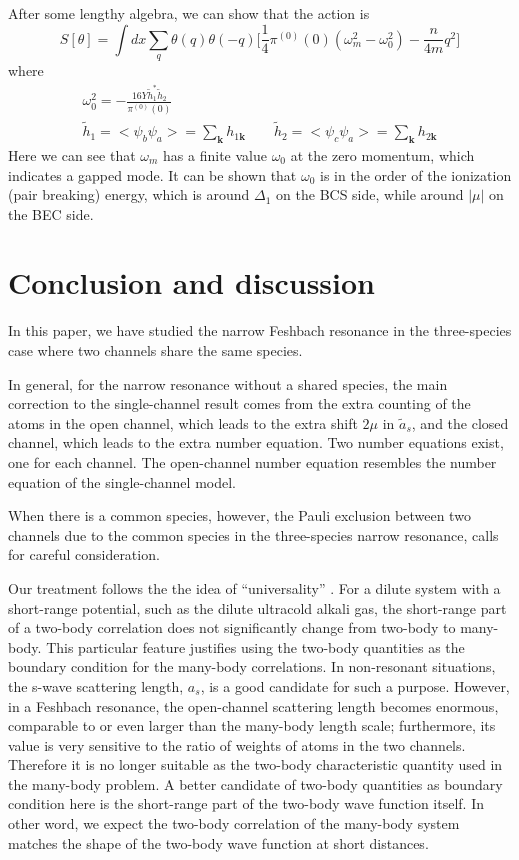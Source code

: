 \documentclass[reprint,pra]{revtex4-1}
\newcommand{\vk}{\ensuremath{\mathbf{k}}}
\newcommand{\nth}[1]{\ensuremath{\frac{1}{#1}}}
\providecommand{\abs}[1]{\ensuremath{\left\lvert{#1}\right\rvert}}
\newcommand{\av}[1]{\ensuremath{\bigl<{#1}\bigr>}}
\begin{document}
  After some lengthy algebra, we can show that the action is 
\begin{equation}\label{eq:pathInt2:outofphase}
S[\theta]=\int{dx}\sum_{q}\theta(q)\theta(-q)\big[\nth{4}\pi^{(0)}(0)(\omega_m^2-\omega_{0}^{2})-\frac{n}{4m}q^2\big]
\end{equation}
where
\begin{gather*}
\omega_{0}^{2}=-\frac{16Y\tilde{h}_{1}^{*}\tilde{h}_{2}}{\pi^{(0)}(0)}\\
 \tilde{h}_{1}=\av{\psi_{b}\psi_{a}}=\sum_{\vk}h_{1\vk}\qquad
\tilde{h}_{2}=\av{\psi_{c}\psi_{a}}=\sum_{\vk}h_{2\vk}
 \end{gather*}
Here we can see that  $\omega_{m}$ has a finite value $\omega_{0}$ at the zero momentum, which indicates a gapped mode. It can be shown that $\omega_{0}$
 is in the order of the ionization (pair breaking) energy, which is around $\Delta_1$ on the BCS side, while around $\abs{\mu}$ on the BEC side. 

\section{Conclusion  and discussion\label{sec:conclusion}}
In this paper, we have studied the narrow Feshbach resonance in  the three-species case where two channels share the same species.  

In general, for the narrow resonance without a shared species, the main correction to the single-channel result comes from the  extra counting of the atoms in the open channel, which leads to the extra shift $2\mu$ in $\tilde{a}_{s}$, and the closed channel, which leads to the extra number equation.  Two number equations exist, one for each channel.  The open-channel number equation resembles the number equation of the single-channel model.

When there is a common species,  however, the  Pauli exclusion between two channels due to the common species in the three-species narrow resonance, calls for careful  consideration. 

  Our treatment follows the the  idea of ``universality'' \cite{Tan2008-1,shizhongUniv}.  For a dilute system with a short-range potential, such as the dilute ultracold alkali gas, the short-range part of a two-body correlation does not significantly change from two-body  to many-body.  This particular feature justifies using the two-body quantities  as the boundary condition for the many-body correlations.  In non-resonant situations, the s-wave scattering length, $a_s$, is a good candidate for such a purpose.  However, in a Feshbach resonance, the open-channel scattering length becomes enormous, comparable to or even larger than the many-body length scale; furthermore, its value is very sensitive to the ratio of weights of atoms in the two channels.  Therefore it is no longer suitable as the two-body characteristic quantity used in  the many-body problem. A better candidate of two-body quantities as boundary condition here is the short-range part of the two-body wave function itself.  In other word, we expect the two-body correlation of the many-body system matches the shape of the two-body wave function  at short distances.  
  
\end{document}
